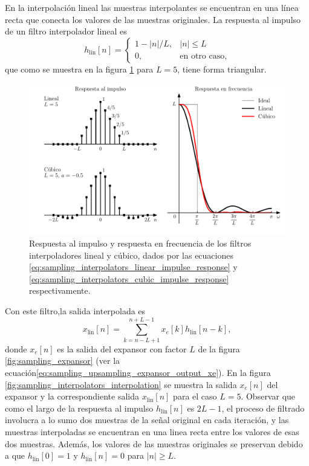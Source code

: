\documentclass[a4paper]{report}
\begin{document}
En la interpolación lineal las muestras interpolantes se encuentran en una línea recta que conecta los valores de las muestras originales. La respuesta al impulso de un filtro interpolador lineal es
\begin{equation}\label{eq:sampling_interpolators_linear_impulse_response}
 h_\textrm{lin}[n]=
 \left\{  
 \begin{array}{ll}
  1-|n|/L, & |n|\leq L\\
  0, & \textrm{en otro caso},
 \end{array}
 \right.
\end{equation}
que como se muestra en la figura \ref{fig:sampling_interpolators_responses} para \(L=5\), tiene forma triangular.
\begin{figure}[!htb]
 \begin{center}
 \includegraphics[width=\textwidth]{figuras/sampling_interpolators_responses.pdf}
 \caption{\label{fig:sampling_interpolators_responses} Respuesta al impulso y respuesta en frecuencia de los filtros interpoladores lineal y cúbico, dados por las ecuaciones \ref{eq:sampling_interpolators_linear_impulse_response} y \ref{eq:sampling_interpolators_cubic_impulse_response} respectivamente.}
 \end{center}
\end{figure}
Con este filtro,la salida interpolada es
\[
 x_\textrm{lin}[n]=\sum_{k=n-L+1}^{n+L-1}x_e[k]h_\textrm{lin}[n-k],
\]
donde \(x_e[n]\) es la salida del expansor con factor \(L\) de la figura \ref{fig:sampling_expansor} (ver la ecuación\ref{eq:sampling_upsampling_expansor_output_xe}). En la figura \ref{fig:sampling_interpolators_interpolation} se muestra la salida \(x_e[n]\) del expansor y la correspondiente salida \(x_\textrm{lin}[n]\) para el caso \(L=5\). Observar que como el largo de la respuesta al impulso \(h_\textrm{lin}[n]\) es \(2L-1\), el proceso de filtrado involucra a lo sumo dos muestras de la señal original en cada iteración, y las muestras interpoladas se encuentran en una linea recta entre los valores de esas dos muestras. Además, los valores de las muestras originales se preservan debido a que \(h_\textrm{lin}[0]=1\) y \(h_\textrm{lin}[n]=0\) para \(|n|\geq L\).
\end{document}
